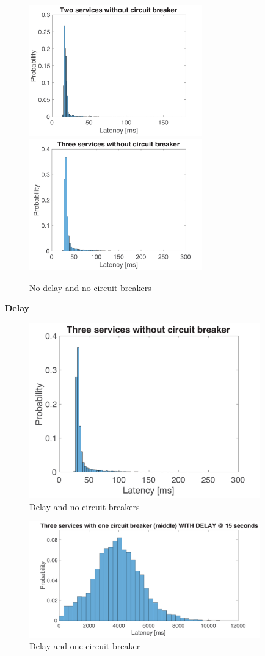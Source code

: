 \begin{figure}[H]
\centering
\includegraphics[width=7.5cm]{figures/appendix/nocb_2svc}
\includegraphics[width=7.5cm]{figures/appendix/nocb_3svc}
\caption{No delay and no circuit breakers}
\label{fig:appendix_circuit_breakers_no_delay}
\end{figure} 


\noindent \textbf{Delay}
\begin{figure}[H]
\centering
\includegraphics[width=10cm]{figures/appendix/nocb_3svc}
\caption{Delay and no circuit breakers}
\end{figure} 

\begin{figure}[H]
\centering
\includegraphics[width=10cm]{figures/appendix/onecb_3svc_delay}
\caption{Delay and one circuit breaker}
\end{figure} 

